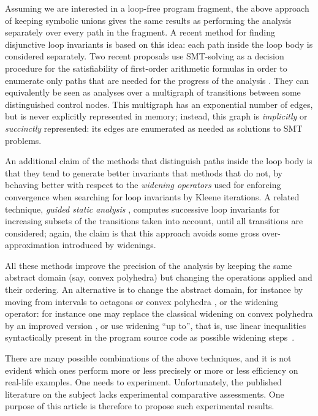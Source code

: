 \documentclass[preprint]{sigplanconf}
\begin{document}
Assuming we are  interested in a loop-free program fragment, the above approach of keeping symbolic unions gives the same results as performing the analysis separately over every path in the fragment.
A recent method for finding disjunctive loop invariants \cite{DBLP:conf/pldi/GulwaniZ10} is based on this idea: each path inside the loop body is considered separately.
Two recent proposals use SMT-solving \cite{Kroening_Strichman_08} as a decision procedure for the satisfiability of first-order arithmetic formulas in order to enumerate only paths that are needed for the progress of the analysis \cite{Gawlitza_Monniaux_ESOP11,Monniaux_Gonnord_SAS11}. They can equivalently be seen as analyses over a multigraph of transitions between some distinguished control nodes. This multigraph has an exponential number of edges, but is never explicitly represented in memory; instead, this graph is \emph{implicitly} or \emph{succinctly} represented: its edges are enumerated as needed as solutions to SMT problems.

An additional claim of the methods that distinguish paths inside the loop body \cite{DBLP:conf/pldi/GulwaniZ10,Monniaux_Gonnord_SAS11} is that they tend to generate better invariants that methods that do not, by behaving better with respect to the \emph{widening operators} \cite{CousotCousot_JLC92}
used for enforcing convergence when searching for loop invariants by Kleene iterations. A related technique, \emph{guided static analysis} \cite{DBLP:conf/sas/GopanR07}, computes successive loop invariants for increasing subsets of the transitions taken into account, until all transitions are considered; again, the claim is that this approach avoids some gross over-approximation introduced by widenings.

All these methods improve the precision of the analysis by keeping the same abstract domain (say, convex polyhedra) but changing the operations applied and their ordering. An alternative is to change the abstract domain, for instance by moving from intervals to octagons or convex polyhedra \cite{DBLP:journals/lisp/Mine06}, or the widening operator: for instance one may replace the classical widening on convex polyhedra \cite{CousotHalbwachs78,Halbwachs_PhD} by an improved version \cite{BagnaraHRZ05SCP}, or use widening ``up to'', that is, use linear inequalities syntactically present in the program source code as possible widening steps~\cite{Polka:FMSD:97}.

There are many possible combinations of the above techniques, and it is not evident which ones perform more or less precisely or more or less efficiency on real-life examples. One needs to experiment.
Unfortunately, the published literature on the subject lacks experimental comparative assessments. One purpose of this article is therefore to propose such experimental results.
\end{document}
